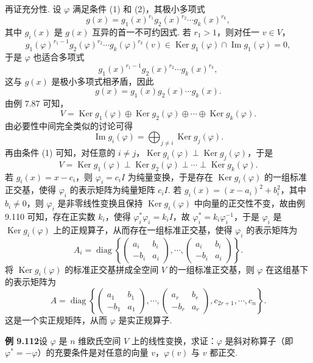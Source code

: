 \documentclass[UTF8,12pt,a4paper,fontset=fandol]{ctexart}
\begin{document}
再证充分性. 设 $\varphi$ 满足条件 (1) 和 (2)，其极小多项式
\[
g(x)=g_1(x)^{r_1}g_2(x)^{r_2}\cdots g_k(x)^{r_k},
\]
其中 $g_i(x)$ 是 $g(x)$ 互异的首一不可约因式. 若 $r_1>1$，则对任一 $v\in V$，
\[
g_1(\varphi)^{r_1-1}g_2(\varphi)^{r_2}\cdots g_k(\varphi)^{r_k}(v)\in\operatorname{Ker}g_1(\varphi)\cap\operatorname{Im}g_1(\varphi)=0,
\]
于是 $\varphi$ 也适合多项式
\[
g_1(x)^{r_1-1}g_2(x)^{r_2}\cdots g_k(x)^{r_k},
\]
这与 $g(x)$ 是极小多项式相矛盾，因此
\[
g(x)=g_1(x)g_2(x)\cdots g_k(x).
\]
由例 7.87 可知，
\[
V=\operatorname{Ker}g_1(\varphi)\oplus\operatorname{Ker}g_2(\varphi)\oplus\cdots\oplus\operatorname{Ker}g_k(\varphi).
\]
由必要性中间完全类似的讨论可得
\[
\operatorname{Im}g_i(\varphi)=\bigoplus_{j\ne i}\operatorname{Ker}g_j(\varphi).
\]
再由条件 (1) 可知，对任意的 $i\ne j$，$\operatorname{Ker}g_i(\varphi)\perp\operatorname{Ker}g_j(\varphi)$，于是
\[
V=\operatorname{Ker}g_1(\varphi)\perp\operatorname{Ker}g_2(\varphi)\perp\cdots\perp\operatorname{Ker}g_k(\varphi).
\]
若 $g_i(x)=x-c_i$，则 $\varphi_i=c_iI$ 为纯量变换，于是存在 $\operatorname{Ker}g_i(\varphi)$ 的一组标准正交基，使得 $\varphi_i$ 的表示矩阵为纯量矩阵 $c_iI$. 若 $g_i(x)=(x-a_i)^2+b_i^2$，其中 $b_i\ne0$，则 $\varphi_i$ 是非零线性变换且保持 $\operatorname{Ker}g_i(\varphi)$ 中向量的正交性不变，故由例 9.110 可知，存在正实数 $k_i$，使得 $\varphi_i^*\varphi_i=k_iI$，故 $\varphi_i^*=k_i\varphi_i^{-1}$，于是 $\varphi_i$ 是 $\operatorname{Ker}g_i(\varphi)$ 上的正规算子，从而存在一组标准正交基，使得 $\varphi_i$ 的表示矩阵为
\[
A_i=\operatorname{diag}\left\{
\begin{pmatrix}
a_i&b_i\\
-b_i&a_i
\end{pmatrix},\cdots,
\begin{pmatrix}
a_i&b_i\\
-b_i&a_i
\end{pmatrix}
\right\}.
\]
将 $\operatorname{Ker}g_i(\varphi)$ 的标准正交基拼成全空间 $V$ 的一组标准正交基，则 $\varphi$ 在这组基下的表示矩阵为
\[
A=\operatorname{diag}\left\{
\begin{pmatrix}
a_1&b_1\\
-b_1&a_1
\end{pmatrix},\cdots,
\begin{pmatrix}
a_r&b_r\\
-b_r&a_r
\end{pmatrix},
c_{2r+1},\cdots,c_n
\right\}.
\]
这是一个实正规矩阵，从而 $\varphi$ 是实正规算子.

\noindent\textbf{例 9.112}\quad 设 $\varphi$ 是 $n$ 维欧氏空间 $V$ 上的线性变换，求证：$\varphi$ 是斜对称算子（即 $\varphi^*=-\varphi$）的充要条件是对任意的向量 $v$，$\varphi(v)$ 与 $v$ 都正交.
\end{document}
